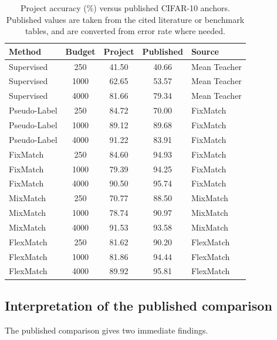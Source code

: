 \begin{table}[htbp]
\centering
\footnotesize
\caption{Project accuracy (\%) versus published CIFAR-10 anchors. Published values are taken from the cited literature or benchmark tables, and are converted from error rate where needed.}
\label{tab:published_compare}
\begin{tabular}{l c c c l}
\hline
Method & Budget & Project & Published & Source \\
\hline
Supervised & 250 & 41.50 & 40.66 & Mean Teacher \cite{Reference3} \\
Supervised & 1000 & 62.65 & 53.57 & Mean Teacher \cite{Reference3} \\
Supervised & 4000 & 81.66 & 79.34 & Mean Teacher \cite{Reference3} \\
Pseudo-Label & 250 & 84.72 & 70.00 & FixMatch \cite{Reference5} \\
Pseudo-Label & 1000 & 89.12 & 89.68 & FixMatch \cite{Reference5} \\
Pseudo-Label & 4000 & 91.22 & 83.91 & FixMatch \cite{Reference5} \\
FixMatch & 250 & 84.60 & 94.93 & FixMatch \cite{Reference5} \\
FixMatch & 1000 & 79.39 & 94.25 & FixMatch \cite{Reference5} \\
FixMatch & 4000 & 90.50 & 95.74 & FixMatch \cite{Reference5} \\
MixMatch & 250 & 70.77 & 88.50 & MixMatch \cite{Reference4} \\
MixMatch & 1000 & 78.74 & 90.97 & MixMatch \cite{Reference4} \\
MixMatch & 4000 & 91.53 & 93.58 & MixMatch \cite{Reference4} \\
FlexMatch & 250 & 81.62 & 90.20 & FlexMatch \cite{Reference7} \\
FlexMatch & 1000 & 81.86 & 94.44 & FlexMatch \cite{Reference7} \\
FlexMatch & 4000 & 89.92 & 95.81 & FlexMatch \cite{Reference7} \\
\hline
\end{tabular}
\end{table}

\subsection{Interpretation of the published comparison}

The published comparison gives two immediate findings.

